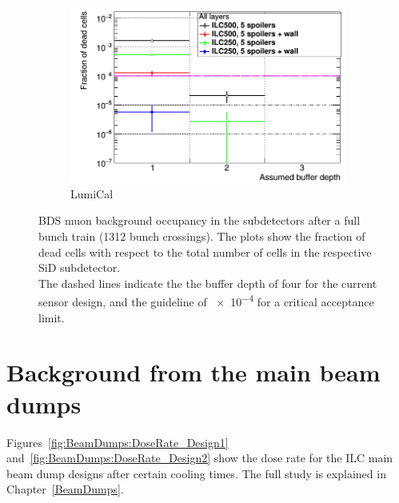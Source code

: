 \begin{figure}[htb]
\begin{subfigure}[b]{0.49\textwidth}
    \includegraphics[width=\textwidth]{Figures/BDS_muons/Occupancy_Comparison_All_layers_deadcells_LumiCal.png}
   \caption{\sid LumiCal}
   \end{subfigure}
   \caption[Occupancy from BDS muons of various SiD subdetectors]{
   BDS muon background occupancy in the \sid subdetectors after a full bunch train (1312 bunch crossings).   
   The plots show the fraction of dead cells with respect to the total number of cells in the respective SiD subdetector.
   \\The dashed lines indicate the the buffer depth of four for the current sensor design, and the guideline of \num{e-4} for a critical acceptance limit.}
 \end{figure}
 
\chapter{Background from the main beam dumps}
\label{Appendix:BeamDump}
Figures~\ref{fig:BeamDumps:DoseRate_Design1} and~\ref{fig:BeamDumps:DoseRate_Design2} show the dose rate for the ILC main beam dump designs after certain cooling times.
The full study is explained in Chapter~\ref{BeamDumps}.

